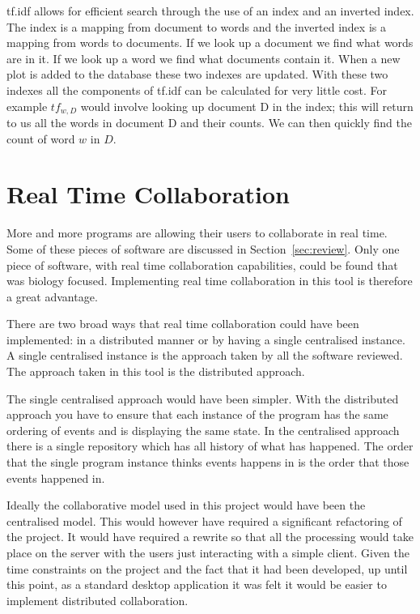 \ac{tf.idf} allows for efficient search through the use of an index and an inverted index.  The index is a mapping from document to words and the inverted index is a mapping from words to documents.  If we look up a document we find what words are in it.  If we look up a word we find what documents contain it.  When a new plot is added to the database these two indexes are updated.  With these two indexes all the components of \ac{tf.idf} can be calculated for very little cost.  For example $tf_{w,D}$ would involve looking up document D in the index; this will return to us all the words in document D and their counts.  We can then quickly find the count of word $w$ in $D$.

\section{Real Time Collaboration}
\label{sec:collaboration}

More and more programs are allowing their users to collaborate in real time.  Some of these pieces of software are discussed in Section~\ref{sec:review}.  Only one piece of software, with real time collaboration capabilities, could be found that was biology focused.  Implementing real time collaboration in this tool is therefore a great advantage.

There are two broad ways that real time collaboration could have been implemented: in a distributed manner or by having a single centralised instance.  A single centralised instance is the approach taken by all the software reviewed.  The approach taken in this tool is the distributed approach.

The single centralised approach would have been simpler.  With the distributed approach you have to ensure that each instance of the program has the same ordering of events and is displaying the same state.  In the centralised approach there is a single repository which has all history of what has happened.  The order that the single program instance thinks events happens in is the order that those events happened in.

Ideally the collaborative model used in this project would have been the centralised model.  This would however have required a significant refactoring of the project.  It would have required a rewrite so that all the processing would take place on the server with the users just interacting with a simple client.  Given the time constraints on the project and the fact that it had been developed, up until this point, as a standard desktop application it was felt it would be easier to implement distributed collaboration.

